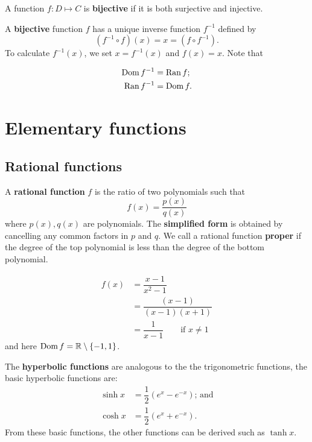 \begin{definition}
    A function $f:D\mapsto C$ is \textbf{bijective} if it is both surjective and injective.
\end{definition}

\begin{theorem}
    A \textbf{bijective} function $f$ has a unique inverse function $f^{-1}$ defined by \[(f^{-1}\circ f)(x)=x=(f\circ f^{-1}).\] To calculate $f^{-1}(x)$, we set $x=f^{-1}(x)$ and $f(x)=x$. Note that
    
    \begin{align*}
        \operatorname{Dom}{f^{-1}}&=\operatorname{Ran}{f};\\
        \operatorname{Ran}{f^{-1}}&=\operatorname{Dom}{f}.
    \end{align*}
\end{theorem}

\section{Elementary functions}


\subsection{Rational functions}

\begin{definition}
    A \textbf{rational function} $f$ is the ratio of two polynomials such that
    \[f(x)=\dfrac{p(x)}{q(x)}\]
    where $p(x),q(x)$ are polynomials. The \textbf{simplified form} is obtained by cancelling any common factors in $p$ and $q$. We call a rational function \textbf{proper} if the degree of the top polynomial is less than the degree of the bottom polynomial.
\end{definition}

\begin{example}
    \begin{align*}
        f(x)&=\dfrac{x-1}{x^2-1}\\
        &=\dfrac{(x-1)}{(x-1)(x+1)}\\
        &=\dfrac{1}{x-1}\qquad\text{if }x\neq1
    \end{align*}
    and here $\operatorname{Dom} f=\mathbb R\setminus\{-1,1\}$.
\end{example}

\begin{definition}
    The \textbf{hyperbolic functions} are analogous to the the trigonometric functions, the basic hyperbolic functions are:
    \begin{align*}
        \sinh{x}&=\dfrac12(e^x-e^{-x})\text{; and}\\
        \cosh{x}&=\dfrac12(e^x+e^{-x}).
    \end{align*}
    From these basic functions, the other functions can be derived such as $\tanh{x}$.
\end{definition}

